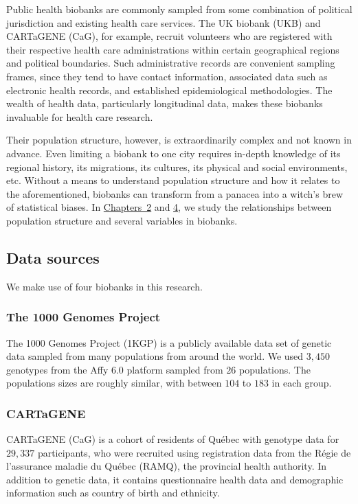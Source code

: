 Public health biobanks are commonly sampled from some combination of political jurisdiction and existing health care services. The UK biobank (UKB) and CARTaGENE (CaG), for example, recruit volunteers who are registered with their respective health care administrations within certain geographical regions and political boundaries\citep{sudlow_uk_2015}\citep{awadalla_cohort_2013}. Such administrative records are convenient sampling frames, since they tend to have contact information, associated data such as electronic health records, and established epidemiological methodologies. The wealth of health data, particularly longitudinal data, makes these biobanks invaluable for health care research. 

Their population structure, however, is extraordinarily complex and not known in advance. Even limiting a biobank to one city requires in-depth knowledge of its regional history, its migrations, its cultures, its physical and social environments, etc. Without a means to understand population structure and how it relates to the aforementioned, biobanks can transform from a panacea into a witch's brew of statistical biases. In \hyperref[chap:chapter2]{Chapters~2} and \hyperref[chap:chapter4]{4}, we study the relationships between population structure and several variables in biobanks.

\subsection{Data sources}

We make use of four biobanks in this research.

\subsubsection{The 1000 Genomes Project}

The 1000 Genomes Project (1KGP) is a publicly available data set of genetic data sampled from many populations from around the world\citep{global_2015}. We used $3,450$ genotypes from the Affy 6.0 platform sampled from $26$  populations. The populations sizes are roughly similar, with between $104$ to $183$ in each group.

\subsubsection{CARTaGENE}

CARTaGENE (CaG) is a cohort of residents of Qu\'{e}bec with genotype data for $29,337$ participants, who were recruited using registration data from the R\'{e}gie de l’assurance maladie du Qu\'{e}bec (RAMQ), the provincial health authority\citep{awadalla_cohort_2013}. In addition to genetic data, it contains questionnaire health data and demographic information such as country of birth and ethnicity.

